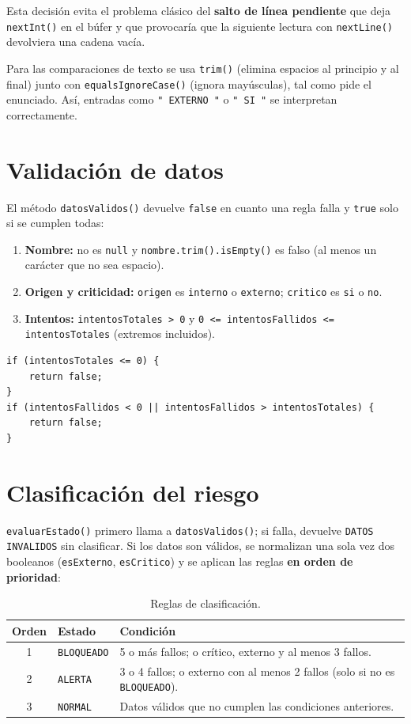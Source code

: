 \documentclass[11pt,a4paper]{article}
\begin{document}
Esta decisión evita el problema clásico del \textbf{salto de línea pendiente}
que deja \texttt{nextInt()} en el búfer y que provocaría que la siguiente
lectura con \texttt{nextLine()} devolviera una cadena vacía.

Para las comparaciones de texto se usa \texttt{trim()} (elimina espacios al
principio y al final) junto con \texttt{equalsIgnoreCase()} (ignora
mayúsculas), tal como pide el enunciado. Así, entradas como
\texttt{"\ EXTERNO\ "} o \texttt{"\ SI\ "} se interpretan correctamente.


\section{Validación de datos}
El método \texttt{datosValidos()} devuelve \texttt{false} en cuanto una regla
falla y \texttt{true} solo si se cumplen todas:

\begin{enumerate}[nosep]
  \item \textbf{Nombre:} no es \texttt{null} y \texttt{nombre.trim().isEmpty()} es falso (al menos un carácter que no sea espacio).
  \item \textbf{Origen y criticidad:} \texttt{origen} es \texttt{interno} o \texttt{externo}; \texttt{critico} es \texttt{si} o \texttt{no}.
  \item \textbf{Intentos:} \texttt{intentosTotales > 0} y \texttt{0 <= intentosFallidos <= intentosTotales} (extremos incluidos).
\end{enumerate}

\begin{lstlisting}
if (intentosTotales <= 0) {
    return false;
}
if (intentosFallidos < 0 || intentosFallidos > intentosTotales) {
    return false;
}
\end{lstlisting}


\section{Clasificación del riesgo}
\texttt{evaluarEstado()} primero llama a \texttt{datosValidos()}; si falla,
devuelve \texttt{DATOS INVALIDOS} sin clasificar. Si los datos son válidos, se
normalizan una sola vez dos booleanos (\texttt{esExterno}, \texttt{esCritico})
y se aplican las reglas \textbf{en orden de prioridad}:

\begin{table}[h!]
\centering
\begin{tabular}{@{}c l p{9cm}@{}}
\toprule
\textbf{Orden} & \textbf{Estado} & \textbf{Condición} \\
\midrule
1 & \texttt{BLOQUEADO} & 5 o más fallos; o crítico, externo y al menos 3 fallos. \\
2 & \texttt{ALERTA}    & 3 o 4 fallos; o externo con al menos 2 fallos (solo si no es \texttt{BLOQUEADO}). \\
3 & \texttt{NORMAL}    & Datos válidos que no cumplen las condiciones anteriores. \\
\bottomrule
\end{tabular}
\caption{Reglas de clasificación.}
\end{table}
\end{document}
